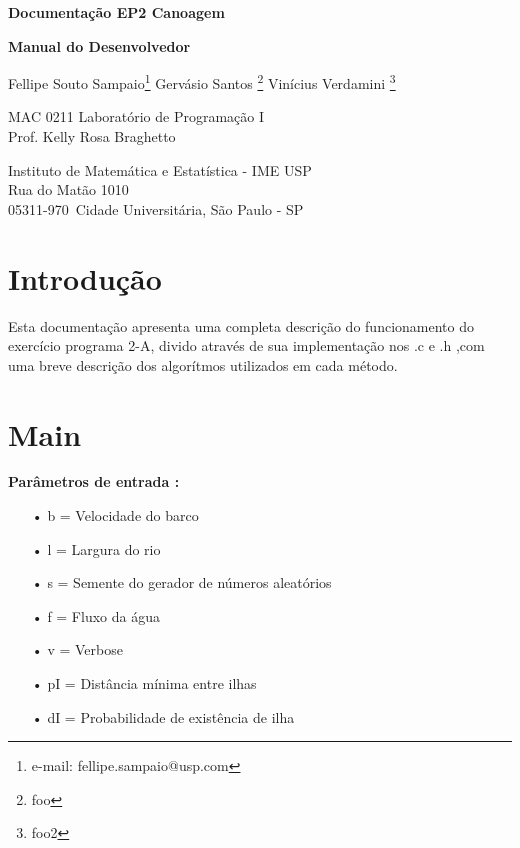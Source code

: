 \documentclass[a4paper,11pt]{article}
\begin{document}
\begin{center}{\Large \bf Documenta\c{c}ão EP2 Canoagem \\ }\end{center}
\begin{center}{\Large \bf Manual do Desenvolvedor\\ }\end{center}

\begin{center}
{
Fellipe Souto Sampaio\footnote{e-mail: fellipe.sampaio@usp.com}
Gervásio Santos \footnote{foo}
Vinícius Verdamini \footnote{foo2}
}

\end{center}

\begin{center}
MAC 0211 Laboratório de Programa\c{c}ão I \\
Prof. Kelly Rosa Braghetto \\
             
\end{center}

\begin{center}
Instituto de Matemática e Estatística - IME USP \\
 Rua do Matão 1010 \\
 05311-970\, Cidade Universitária, São Paulo - SP \\
\end{center}

\newpage

\section{Introdu\c{c}ão}
Esta documenta\c{c}ão apresenta uma completa descri\c{c}ão do funcionamento do exercício programa 2-A, divido através de sua implementa\c{c}ão nos .c e .h ,com uma breve descri\c{c}ão dos algorítmos utilizados em cada método.

\section{Main}
\textbf{Parâmetros de entrada :}
\begin{enumerate}
\item[•]{b =  Velocidade do barco}
\item[•]{l =  Largura do rio}
\item[•]{s =  Semente do gerador de números aleatórios}
\item[•]{f =  Fluxo da água}
\item[•]{v =  Verbose}
\item[•]{pI = Distância mínima entre ilhas}
\item[•]{dI = Probabilidade de existência de ilha}


\end{enumerate}
\end{document}
